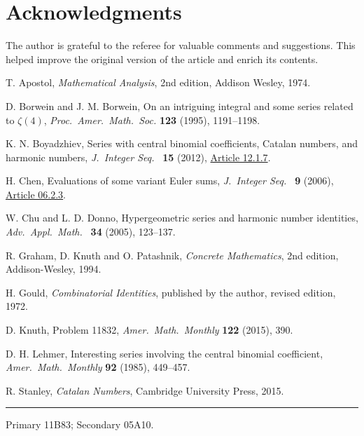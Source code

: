 \documentclass[12pt,reqno]{article}
\begin{document}
\section{Acknowledgments} The author is grateful to the referee for valuable comments and suggestions. This helped improve the original version of the article and enrich its contents.


\begin{thebibliography}{10}

T. Apostol, {\it Mathematical Analysis}, 2nd edition, Addison Wesley,
1974.

D. Borwein and J. M. Borwein, On an intriguing integral and some
series related to $\zeta(4)$, {\it Proc.\ Amer.\ Math.\ Soc.} {\bf
123} (1995), 1191--1198.

 K. N. Boyadzhiev, Series with central binomial
coefficients, Catalan numbers, and harmonic numbers, {\it J.\ Integer
Seq.\ }  {\bf 15} (2012), 
\href{https://cs.uwaterloo.ca/journals/JIS/VOL15/Boyadzhiev/boyadzhiev6.html}{Article 12.1.7}.

H. Chen, Evaluations of some variant Euler sums, {\it J.\ Integer
Seq.\ } {\bf 9} (2006), 
\href{https://cs.uwaterloo.ca/journals/JIS/VOL9/Chen/chen78.html}{Article 06.2.3}.

W. Chu and L. D. Donno, Hypergeometric series and harmonic number
identities, {\it Adv.\ Appl.\ Math.\ } {\bf 34} (2005), 123--137.

R. Graham, D. Knuth and O. Patashnik, {\it Concrete
Mathematics}, 2nd edition, Addison-Wesley, 1994.

H. Gould, {\it Combinatorial Identities}, published by the author,
revised edition, 1972.

D. Knuth, Problem 11832, {\it Amer.\ Math.\ Monthly} {\bf 122} (2015), 390.

D. H. Lehmer, Interesting series involving the central binomial
coefficient, {\it Amer.\ Math.\ Monthly} {\bf 92} (1985), 449--457.

R. Stanley, {\it Catalan Numbers}, Cambridge University Press, 2015.

\end{thebibliography}

\bigskip
\hrule
\bigskip

 Primary 11B83; Secondary 05A10.
\end{document}
